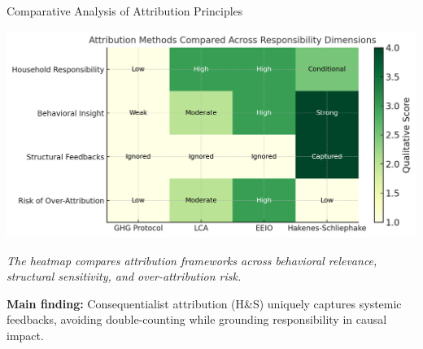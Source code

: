 \documentclass{beamer}
\begin{document}
\begin{frame}{Comparative Analysis of Attribution Principles}
\small
\vspace{-2.5em}
\begin{center}
  \includegraphics[width=0.75\linewidth]{Heatmap Res.png}

  \footnotesize
\textit{The heatmap compares attribution frameworks across behavioral relevance, structural sensitivity, and over-attribution risk.}
\end{center}
\footnotesize
\vspace{0.4em}
\textbf{Main finding:} Consequentialist attribution (H\&S) uniquely captures systemic feedbacks, avoiding double-counting while grounding responsibility in causal impact.
\end{frame}
\end{document}
